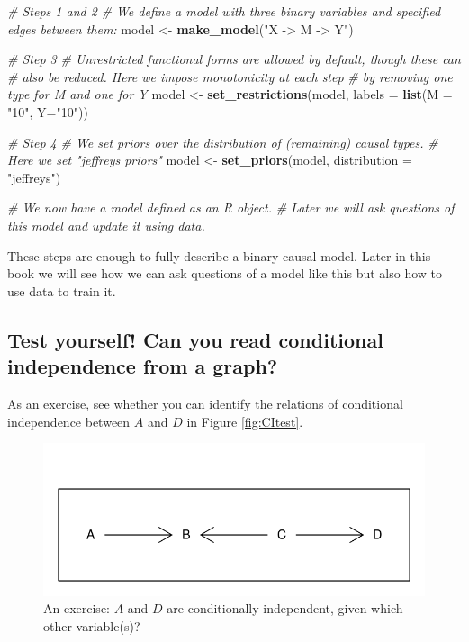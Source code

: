 \documentclass[
  12pt,
]{book}
\newenvironment{Shaded}{\begin{snugshade}}{\end{snugshade}}
\newcommand{\CommentTok}[1]{\textcolor[rgb]{0.56,0.35,0.01}{\textit{#1}}}
\newcommand{\DataTypeTok}[1]{\textcolor[rgb]{0.13,0.29,0.53}{#1}}
\newcommand{\KeywordTok}[1]{\textcolor[rgb]{0.13,0.29,0.53}{\textbf{#1}}}
\newcommand{\NormalTok}[1]{#1}
\newcommand{\StringTok}[1]{\textcolor[rgb]{0.31,0.60,0.02}{#1}}
\begin{document}
\begin{Shaded}
\begin{Highlighting}[]
\CommentTok{# Steps 1 and 2 }
\CommentTok{# We define a model with three binary variables and specified edges between them:}
\NormalTok{model <-}\StringTok{ }\KeywordTok{make_model}\NormalTok{(}\StringTok{"X -> M -> Y"}\NormalTok{)}

\CommentTok{# Step 3}
\CommentTok{# Unrestricted functional forms are allowed by default, though these can }
\CommentTok{# also be reduced. Here we impose monotonicity at each step }
\CommentTok{# by removing one type for M and one for Y}
\NormalTok{model <-}\StringTok{ }\KeywordTok{set_restrictions}\NormalTok{(model, }\DataTypeTok{labels =} \KeywordTok{list}\NormalTok{(}\DataTypeTok{M =} \StringTok{"10"}\NormalTok{, }\DataTypeTok{Y=}\StringTok{"10"}\NormalTok{))}

\CommentTok{# Step 4}
\CommentTok{# We set priors over the distribution of (remaining) causal types.}
\CommentTok{# Here we set "jeffreys priors"}
\NormalTok{model <-}\StringTok{ }\KeywordTok{set_priors}\NormalTok{(model, }\DataTypeTok{distribution =} \StringTok{"jeffreys"}\NormalTok{)}

\CommentTok{# We now have a model defined as an R object. }
\CommentTok{# Later we will ask questions of this model and update it using data.}
\end{Highlighting}
\end{Shaded}

These steps are enough to fully describe a binary causal model. Later in this book we will see how we can ask questions of a model like this but also how to use data to train it.

\hypertarget{test-yourself-can-you-read-conditional-independence-from-a-graph}{%
\subsection{Test yourself! Can you read conditional independence from a graph?}\label{test-yourself-can-you-read-conditional-independence-from-a-graph}}

As an exercise, see whether you can identify the relations of conditional independence between \(A\) and \(D\) in Figure \ref{fig:CItest}.

\begin{figure}

{\centering \includegraphics[width=.9\textwidth]{ii_files/figure-latex/exercise-1} 

}

\caption{\label{fig:CItest} An exercise: $A$ and $D$ are conditionally independent, given which other variable(s)?}\label{fig:exercise}
\end{figure}
\end{document}
